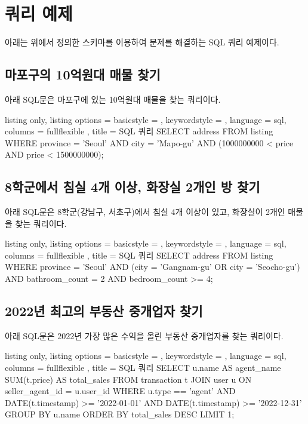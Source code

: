 \documentclass{article}
\begin{document}
\section{쿼리 예제}

아래는 위에서 정의한 스키마를 이용하여 문제를 해결하는 SQL 쿼리 예제이다.

\subsection{마포구의 10억원대 매물 찾기}

아래 SQL문은 마포구에 있는 10억원대 매물을 찾는 쿼리이다.

\begin{tcblisting}{
    listing only,
    listing options = {
      basicstyle = \ttfamily,
      keywordstyle = \color{blue},
      language = sql,
      columns = fullflexible
    },
    title = SQL 쿼리
  }
  SELECT address
  FROM listing
  WHERE
    province = 'Seoul'
    AND city = 'Mapo-gu'
    AND (1000000000 < price AND price < 1500000000);
\end{tcblisting}
\newpage

\subsection{8학군에서 침실 4개 이상, 화장실 2개인 방 찾기}

아래 SQL문은 8학군(강남구, 서초구)에서 침실 4개 이상이 있고, 화장실이 2개인 매물을 찾는 쿼리이다.

\begin{tcblisting}{
    listing only,
    listing options = {
      basicstyle = \ttfamily,
      keywordstyle = \color{blue},
      language = sql,
      columns = fullflexible
    },
    title = SQL 쿼리
  }
  SELECT address
  FROM listing
  WHERE
    province = 'Seoul'
    AND (city = 'Gangnam-gu' OR city = 'Seocho-gu')
    AND bathroom_count = 2
    AND bedroom_count >= 4;
\end{tcblisting}
\newpage

\subsection{2022년 최고의 부동산 중개업자 찾기}

아래 SQL문은 2022년 가장 많은 수익을 올린 부동산 중개업자를 찾는 쿼리이다.

\begin{tcblisting}{
    listing only,
    listing options = {
      basicstyle = \ttfamily,
      keywordstyle = \color{blue},
      language = sql,
      columns = fullflexible
    },
    title = SQL 쿼리
  }
  SELECT
    u.name AS agent_name
    SUM(t.price) AS total_sales
  FROM
    transaction t
  JOIN
    user u ON seller_agent_id = u.user_id
  WHERE
    u.type == 'agent'
    AND DATE(t.timestamp) >= '2022-01-01'
    AND DATE(t.timestamp) >= '2022-12-31'
  GROUP BY
    u.name
  ORDER BY
    total_sales DESC
  LIMIT 1;
\end{tcblisting}
\newpage
\end{document}
